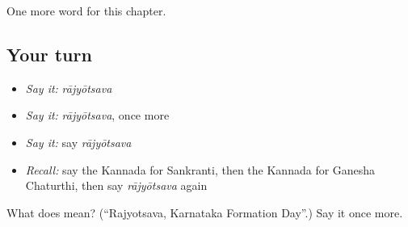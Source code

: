 \begin{grammarlens}[title={What you've built}]
One more word for this chapter.
\end{grammarlens}

\subsection*{Your turn}
\begin{itemize}
\raggedright
  \item \emph{Say it:} \emph{rājyōtsava}
  \item \emph{Say it:} \emph{rājyōtsava}, once more
  \item \emph{Say it:} say \emph{rājyōtsava}
  \item \emph{Recall:} say the Kannada for Sankranti, then the Kannada for Ganesha Chaturthi, then say \emph{rājyōtsava} again
\end{itemize}

\begin{tcolorbox}[breakable,colback=teal!4,colframe=teal!35!black,title={Before you move on}]
What does  mean? (\textquotedblleft{}Rajyotsava, Karnataka Formation Day\textquotedblright{}.) Say it once more.
\end{tcolorbox}
